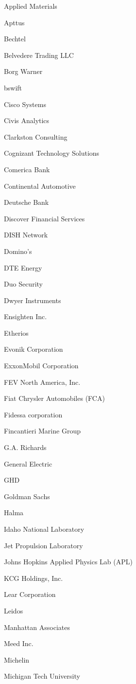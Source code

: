 \documentclass[twoside]{article}
\begin{document}
\begin{center}
\begin{multicols}{5}
\begin{FlushLeft}
\begin{compactitem}
\item Applied Materials
\item Apttus
\item Bechtel
\item Belvedere Trading LLC
\item Borg Warner
\item bswift
\item Cisco Systems
\item Civis Analytics
\item Clarkston Consulting
\item Cognizant Technology Solutions
\item Comerica Bank
\item Continental Automotive
\item Deutsche Bank
\item Discover Financial Services
\item DISH Network
\item Domino's
\item DTE Energy
\item Duo Security
\item Dwyer Instruments
\item Ensighten Inc.
\item Etherios
\item Evonik Corporation
\item ExxonMobil Corporation
\item FEV North America, Inc.
\item Fiat Chrysler Automobiles (FCA)
\item Fidessa corporation
\item Fincantieri Marine Group
\item G.A. Richards
\item General Electric
\item GHD
\item Goldman Sachs
\item Halma
\item Idaho National Laboratory
\item Jet Propulsion Laboratory
\item Johns Hopkins Applied Physics Lab (APL)
\item KCG Holdings, Inc.
\item Lear Corporation
\item Leidos
\item Manhattan Associates
\item Meed Inc.
\item Michelin
\item Michigan Tech University

\end{compactitem}
\end{FlushLeft}
\end{multicols}
\end{center}
\end{document}
